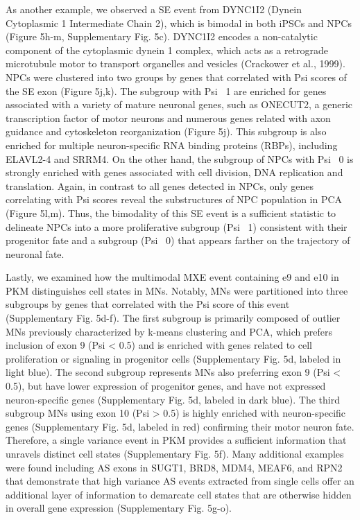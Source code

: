 As another example, we observed a SE event from DYNC1I2 (Dynein Cytoplasmic 1 Intermediate Chain 2), which is bimodal in both iPSCs and NPCs (Figure 5h-m, Supplementary Fig. 5c). DYNC1I2 encodes a non-catalytic component of the cytoplasmic dynein 1 complex, which acts as a retrograde microtubule motor to transport organelles and vesicles (Crackower et al., 1999). NPCs were clustered into two groups by genes that correlated with Psi scores of the SE exon (Figure 5j,k). The subgroup with Psi ~1 are enriched for genes associated with a variety of mature neuronal genes, such as ONECUT2, a generic transcription factor of motor neurons and numerous genes related with axon guidance and cytoskeleton reorganization (Figure 5j). This subgroup is also enriched for multiple neuron-specific RNA binding proteins (RBPs), including ELAVL2-4 and SRRM4. On the other hand, the subgroup of NPCs with Psi ~0 is strongly enriched with genes associated with cell division, DNA replication and translation. Again, in contrast to all genes detected in NPCs, only genes correlating with Psi scores reveal the substructures of NPC population in PCA (Figure 5l,m). Thus, the bimodality of this SE event is a sufficient statistic to delineate NPCs into a more proliferative subgroup (Psi ~1) consistent with their progenitor fate and a subgroup (Psi ~0) that appears farther on the trajectory of neuronal fate.

Lastly, we examined how the multimodal MXE event containing e9 and e10 in PKM distinguishes cell states in MNs. Notably, MNs were partitioned into three subgroups by genes that correlated with the Psi score of this event (Supplementary Fig. 5d-f). The first subgroup is primarily composed of outlier MNs previously characterized by k-means clustering and PCA, which prefers inclusion of exon 9 (Psi < 0.5) and is enriched with genes related to cell proliferation or signaling in progenitor cells (Supplementary Fig. 5d, labeled in light blue). The second subgroup represents MNs also preferring exon 9 (Psi < 0.5), but have lower expression of progenitor genes, and have not expressed neuron-specific genes (Supplementary Fig. 5d, labeled in dark blue). The third subgroup MNs using exon 10 (Psi > 0.5) is highly enriched with neuron-specific genes (Supplementary Fig. 5d, labeled in red) confirming their motor neuron fate. Therefore, a single variance event in PKM provides a sufficient information that unravels distinct cell states (Supplementary Fig. 5f). Many additional examples were found including AS exons in SUGT1, BRD8, MDM4, MEAF6, and RPN2 that demonstrate that high variance AS events extracted from single cells offer an additional layer of information to demarcate cell states that are otherwise hidden in overall gene expression (Supplementary Fig. 5g-o).

